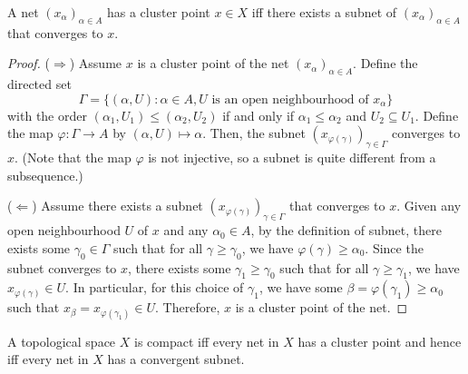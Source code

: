 \begin{proposition}
    A net \((x_\alpha)_{\alpha \in A}\) has a cluster point \(x \in X\) iff there exists a subnet of \((x_\alpha)_{\alpha \in A}\) that converges to \(x\).
\end{proposition}
\begin{proof}
    (\(\Rightarrow\)) Assume \(x\) is a cluster point of the net \((x_\alpha)_{\alpha \in A}\). Define the directed set 
    \[
        \Gamma = \{(\alpha, U) : \alpha \in A, U \text{ is an open neighbourhood of } x_\alpha\}
    \]
    with the order \((\alpha_1, U_1) \leq (\alpha_2, U_2)\) if and only if \(\alpha_1 \leq \alpha_2\) and \(U_2 \subseteq U_1\). Define the map \(\varphi: \Gamma \to A\) by $(\alpha,U)\mapsto \alpha$. Then, the subnet \((x_{\varphi(\gamma)})_{\gamma \in \Gamma}\) converges to \(x\). (Note that the map $\varphi$ is not injective, so a subnet is quite different from a subsequence.)

    (\(\Leftarrow\)) Assume there exists a subnet \((x_{\varphi(\gamma)})_{\gamma \in \Gamma}\) that converges to \(x\). Given any open neighbourhood \(U\) of \(x\) and any \(\alpha_0 \in A\), by the definition of subnet, there exists some \(\gamma_0 \in \Gamma\) such that for all \(\gamma \geq \gamma_0\), we have \(\varphi(\gamma) \geq \alpha_0\). Since the subnet converges to \(x\), there exists some \(\gamma_1 \geq \gamma_0\) such that for all \(\gamma \geq \gamma_1\), we have \(x_{\varphi(\gamma)} \in U\). In particular, for this choice of $\gamma_1$, we have some $\beta = \varphi(\gamma_1) \geq \alpha_0$ such that $x_\beta = x_{\varphi(\gamma_1)} \in U$. Therefore, $x$ is a cluster point of the net.
\end{proof}

\begin{theorem}
    A topological space \(X\) is compact iff every net in \(X\) has a cluster point and hence iff every net in \(X\) has a convergent subnet.
\end{theorem}

